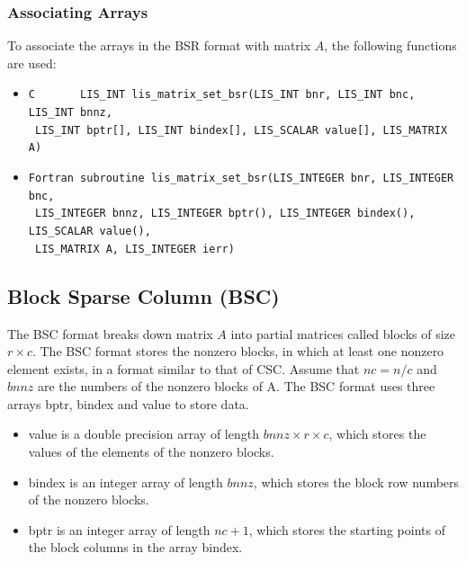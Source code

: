 \documentclass[a4paper]{article}
\begin{document}
\subsubsection{Associating Arrays}
To associate the arrays in the BSR format with matrix $A$, the following functions are used:
\begin{itemize}
\item \verb|C       LIS_INT lis_matrix_set_bsr(LIS_INT bnr, LIS_INT bnc, LIS_INT bnnz,|\\
      \verb| LIS_INT bptr[], LIS_INT bindex[], LIS_SCALAR value[], LIS_MATRIX A)|
\item \verb|Fortran subroutine lis_matrix_set_bsr(LIS_INTEGER bnr, LIS_INTEGER bnc,|\\
      \verb| LIS_INTEGER bnnz, LIS_INTEGER bptr(), LIS_INTEGER bindex(), LIS_SCALAR value(),|\\
      \verb| LIS_MATRIX A, LIS_INTEGER ierr)|
\end{itemize}

\newpage
\subsection{Block Sparse Column (BSC)}
The BSC format breaks down matrix $A$ into partial matrices called
blocks of size $r \times c$. The BSC format stores the nonzero blocks, in which at
least one nonzero element exists, in a format similar to that of CSC. Assume
that $nc=n/c$ and $bnnz$ are the numbers of the nonzero
blocks of A. The BSC format uses three arrays {\ttfamily bptr}, {\ttfamily bindex}
and {\ttfamily value} to store data. 
\begin{itemize}
\item {\ttfamily value} is a double precision array of length
      $bnnz \times r \times c$, which stores the values of the elements of the nonzero blocks.
\item {\ttfamily bindex} is an integer array of length $bnnz$,
      which stores the block row numbers of the nonzero blocks.
\item {\ttfamily bptr} is an integer array of length $nc+1$,
      which stores the starting points of the block columns in the array
      {\ttfamily bindex}.
\end{itemize}
\end{document}
